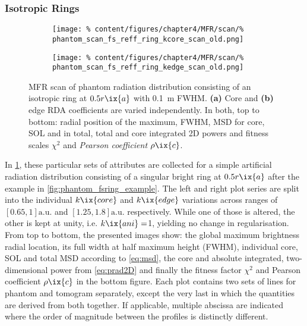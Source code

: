             \subsubsection*{Isotropic Rings}%
%
                \begin{figure}[t]%
                    \centering%
                    \begin{subfigure}{0.45\textwidth}%
                        \centering%
                        \texttt{[image: \%
                            content/figures/chapter4/MFR/scan/\%
                            phantom\_scan\_fs\_reff\_ring\_kcore\_scan\_old.png]}%
                        \caption{}%
                    \end{subfigure}%
                    \begin{subfigure}{0.45\textwidth}%
                        \centering%
                        \texttt{[image: \%
                            content/figures/chapter4/MFR/scan/\%
                            phantom\_scan\_fs\_reff\_ring\_kedge\_scan\_old.png]}%
                        \caption{}%
                    \end{subfigure}%
                    \caption{MFR scan of phantom radiation distribution consisting of an isotropic ring at $0.5r\ix{a}$ with \SI{0.1}{\meter} FWHM. \textbf{(a)} Core and \textbf{(b)} edge RDA coefficients are varied independently. In both, top to bottom: radial position of the maximum, FWHM, MSD for core, SOL and in total, total and core integrated 2D powers and fitness scales $\chi^{2}$ and \textit{Pearson coefficient} $\rho\ix{c}$.}\label{fig:phantom_scans_fsring_kani_coreEdge}%
                \end{figure}%
%
                In \cref{fig:phantom_scans_fsring_kani_coreEdge}, these particular sets of attributes are collected for a simple artificial radiation distribution consisting of a singular bright ring at $0.5r\ix{a}$ after the example in \cref{fig:phantom_fsring_example}. The left and right plot series are split into the individual $k\ix{core}$ and $k\ix{edge}$ variations across ranges of $\left[0.65, 1\right]\text{a.u.}$ and $\left[1.25,1.8\right]\text{a.u.}$ respectively. While one of those is altered, the other is kept at unity, i.e. $k\ix{ani}=$\SI{1}{\arbitraryunit}, yielding no change in regularisation. From top to bottom, the presented images show: the global maximum brightness radial location, its full width at half maximum height (FWHM), individual core, SOL and total MSD according to \cref{eq:msd}, the core and absolute integrated, two-dimensional power from \cref{eq:prad2D} and finally the fitness factor $\chi^{2}$ and Pearson coefficient $\rho\ix{c}$ in the bottom figure. Each plot contains two sets of lines for phantom and tomogram separately, except the very last in which the quantities are derived from both together. If applicable, multiple abscissa are indicated where the order of magnitude between the profiles is distinctly different.\\%
